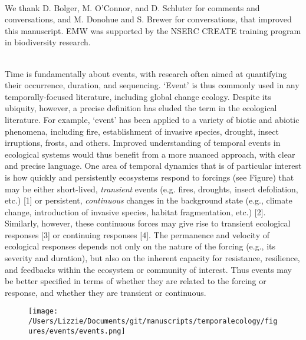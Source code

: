 \documentclass[11pt,a4paper,oneside]{article}
\begin{document}
\\
We thank D. Bolger, M. O'Connor, and D. Schluter for comments and conversations, and M. Donohue and S. Brewer for conversations, that improved this manuscript. EMW was supported by the NSERC CREATE training program in biodiversity research.  %


\newpage
{}\\ %
\noindent Time is fundamentally about events, with research often aimed at quantifying their occurrence, duration, and sequencing. `Event' is thus commonly used in any temporally-focused literature, including global change ecology. Despite its ubiquity, however, a precise definition has eluded the term in the ecological literature. For example, `event' has been applied to a variety of biotic and abiotic phenomena, including fire, establishment of invasive species, drought, insect irruptions, frosts, and others. Improved understanding of temporal events in ecological systems would thus benefit from a more nuanced approach, with clear and precise language. One area of temporal dynamics that is of particular interest is how quickly and persistently ecosystems respond to forcings (see Figure) that may be either short-lived, \emph{transient} events (e.g. fires, droughts, insect defoliation, etc.) [1] or persistent, \emph{continuous} changes in the background state (e.g., climate change, introduction of invasive species, habitat fragmentation, etc.) [2]. Similarly, however, these continuous forces may give rise to transient ecological responses [3] or continuing responses [4]. The permanence and velocity of ecological responses depends not only on the nature of the forcing (e.g., its severity and duration), but also on the inherent capacity for resistance, resilience, and feedbacks within the ecosystem or community of interest. Thus events may be better specified in terms of whether they are related to the forcing or response, and whether they are transient or continuous.\\

\begin{figure}[h!]
\centering
\noindent \texttt{[image: /Users/Lizzie/Documents/git/manuscripts/temporalecology/figures/events/events.png]}
\end{figure}
\end{document}

